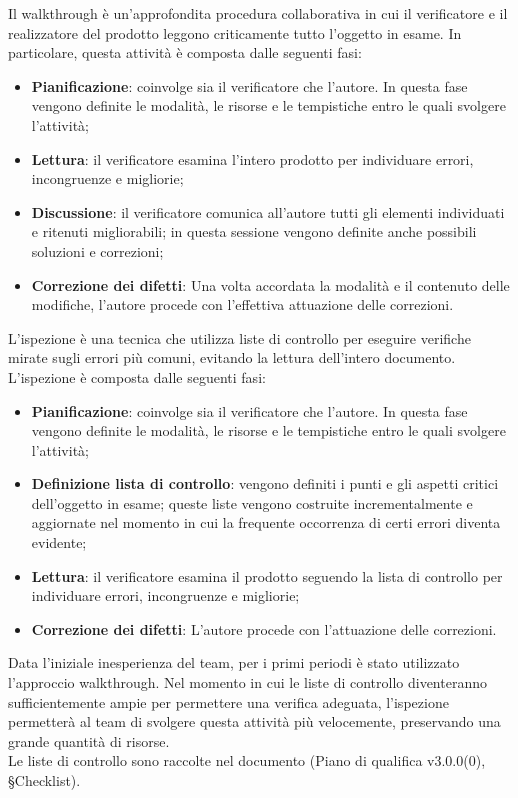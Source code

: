 \documentclass[10pt, a4paper]{article}
\begin{document}
 Il walkthrough è un'approfondita procedura collaborativa in cui il verificatore e il realizzatore del prodotto leggono criticamente tutto l'oggetto in esame. In particolare, questa attività è composta dalle seguenti fasi:
\begin{itemize}
    \item \textbf{Pianificazione}: coinvolge sia il verificatore che l'autore. In questa fase vengono definite le modalità, le risorse e le tempistiche entro le quali svolgere l'attività;
    \item \textbf{Lettura}: il verificatore esamina l'intero prodotto per individuare errori, incongruenze e migliorie;
    \item \textbf{Discussione}: il verificatore comunica all'autore tutti gli elementi individuati e ritenuti migliorabili; in questa sessione vengono definite anche possibili soluzioni e correzioni;
    \item \textbf{Correzione dei difetti}: Una volta accordata la modalità e il contenuto delle modifiche, l'autore procede con l'effettiva attuazione delle correzioni.
\end{itemize}

 L'ispezione è una tecnica che utilizza liste di controllo per eseguire verifiche mirate sugli errori più comuni, evitando la lettura dell'intero documento. L'ispezione è composta dalle seguenti fasi:
\begin{itemize}
    \item \textbf{Pianificazione}: coinvolge sia il verificatore che l'autore. In questa fase vengono definite le modalità, le risorse e le tempistiche entro le quali svolgere l'attività;
    \item \textbf{Definizione lista di controllo}: vengono definiti i punti e gli aspetti critici dell'oggetto in esame; queste liste vengono costruite incrementalmente e aggiornate nel momento in cui la frequente occorrenza di certi errori diventa evidente;
    \item \textbf{Lettura}: il verificatore esamina il prodotto seguendo la lista di controllo per individuare errori, incongruenze e migliorie;
    \item \textbf{Correzione dei difetti}: L'autore procede con l'attuazione delle correzioni.
\end{itemize}

Data l'iniziale inesperienza del team, per i primi periodi è stato utilizzato l'approccio walkthrough.
Nel momento in cui le liste di controllo diventeranno sufficientemente ampie per permettere una verifica adeguata, l'ispezione permetterà al team di svolgere questa attività più velocemente, preservando una grande quantità di risorse.\\
Le liste di controllo sono raccolte nel documento (Piano di qualifica v3.0.0(0), \S Checklist).
\end{document}
